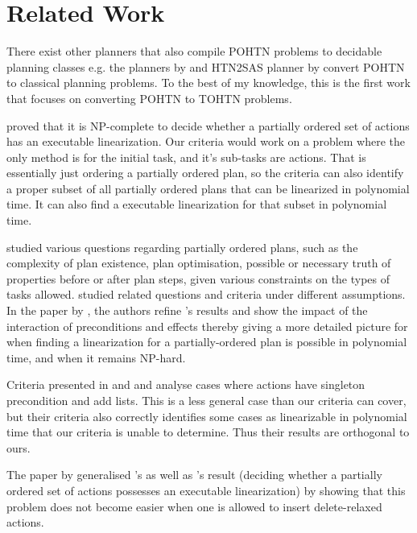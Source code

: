 \documentclass[letterpaper]{article} %
\begin{document}
\section{Related Work}
There exist other planners that also compile POHTN problems to decidable planning classes e.g. the planners by \cite{HTN2STRIPS} and HTN2SAS planner by \cite{HTN2SAS} convert POHTN to classical planning problems. To the best of my knowledge, this is the first work that focuses on converting POHTN to TOHTN problems.

\cite{ErolHTNExpressivity} proved that it is NP-complete to decide whether a partially ordered set
of actions has an executable linearization. Our criteria would work on a problem where the only method is for the initial task, and it’s sub-tasks are actions. That is essentially just ordering a partially ordered plan, so the criteria can also identify a proper subset of all partially ordered plans that can be linearized in polynomial time. It can also find a executable linearization for that subset in polynomial time.

\cite{NEBEL1994125} studied various questions regarding partially ordered plans, such as the complexity of plan existence, plan optimisation, possible or necessary truth of properties before or after plan steps, given various constraints on the types of tasks allowed.  \cite{KambhampatiModalTruth1996} studied related questions and criteria under different assumptions.
In the paper by \cite{TanGruningerPOPlanComplexity}, the authors refine \cite{NEBEL1994125}'s results and show the impact of the interaction of preconditions and effects thereby giving a more detailed picture for when finding a linearization for a partially-ordered plan is possible in polynomial time, and when it remains NP-hard. 

Criteria presented in \cite{NEBEL1994125} and \cite{KambhampatiModalTruth1996} and  \cite{TanGruningerPOPlanComplexity} analyse cases where actions have singleton precondition and add lists. This is a less general case than our criteria can cover, but their criteria also correctly identifies some cases as linearizable in polynomial time that our criteria is unable to determine. Thus their results are orthogonal to ours. 

The paper by \cite{DeleteRelaxation, Bercher2021POCLComplexities} generalised \cite{NEBEL1994125}'s as well as \cite{ErolHTNExpressivity}'s result (deciding whether a partially ordered
set of actions possesses an executable linearization) by showing that this problem does not become easier when one is allowed to insert delete-relaxed  actions.
\end{document}
